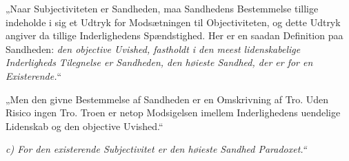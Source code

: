 „Naar Subjectiviteten er Sandheden, maa Sandhedens Bestemmelse
tillige indeholde i sig et Udtryk for Modsætningen til
Objectiviteten, og dette Udtryk angiver da tillige Inderlighedens
Spændstighed. Her er en saadan Definition paa Sandheden:
\emph{den objective Uvished, fastholdt i den meest lidenskabelige
Inderligheds Tilegnelse er Sandheden, den høieste Sandhed, der er
for en Existerende.}“

„Men den givne Bestemmelse af Sandheden er en Omskrivning af Tro.
Uden Risico ingen Tro. Troen er netop Modsigelsen imellem
Inderlighedens uendelige Lidenskab og den objective Uvished.“
 \begin{center}
\emph{c) For den existerende Subjectivitet er den høieste Sandhed
Paradoxet.“}
\end{center}

